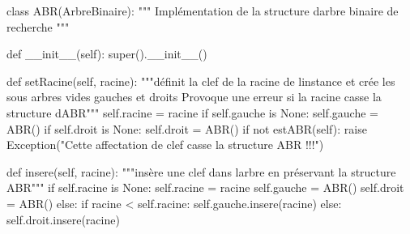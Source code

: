\documentclass[
  letterpaper,
  DIV=11,
  numbers=noendperiod]{scrartcl}
\newenvironment{Shaded}{\begin{snugshade}}{\end{snugshade}}
\newcommand{\BuiltInTok}[1]{\textcolor[rgb]{0.00,0.23,0.31}{#1}}
\newcommand{\CommentTok}[1]{\textcolor[rgb]{0.37,0.37,0.37}{#1}}
\newcommand{\ControlFlowTok}[1]{\textcolor[rgb]{0.00,0.23,0.31}{#1}}
\newcommand{\FunctionTok}[1]{\textcolor[rgb]{0.28,0.35,0.67}{#1}}
\newcommand{\KeywordTok}[1]{\textcolor[rgb]{0.00,0.23,0.31}{#1}}
\newcommand{\NormalTok}[1]{\textcolor[rgb]{0.00,0.23,0.31}{#1}}
\newcommand{\OperatorTok}[1]{\textcolor[rgb]{0.37,0.37,0.37}{#1}}
\newcommand{\PreprocessorTok}[1]{\textcolor[rgb]{0.68,0.00,0.00}{#1}}
\newcommand{\StringTok}[1]{\textcolor[rgb]{0.13,0.47,0.30}{#1}}
\newcommand{\VariableTok}[1]{\textcolor[rgb]{0.07,0.07,0.07}{#1}}
\begin{document}
\begin{Shaded}
\begin{Highlighting}[]
\KeywordTok{class}\NormalTok{ ABR(ArbreBinaire):}
    \CommentTok{""" Implémentation de la structure d\textquotesingle{}arbre binaire de recherche """}

    \KeywordTok{def} \FunctionTok{\_\_init\_\_}\NormalTok{(}\VariableTok{self}\NormalTok{):}
        \BuiltInTok{super}\NormalTok{().}\FunctionTok{\_\_init\_\_}\NormalTok{()}

    \KeywordTok{def}\NormalTok{ setRacine(}\VariableTok{self}\NormalTok{, racine):}
        \CommentTok{"""définit la clef de la racine de l\textquotesingle{}instance}
\CommentTok{         et crée les sous arbres vides gauches et droits}
\CommentTok{         Provoque une erreur si la racine casse la structure d\textquotesingle{}ABR"""}
        \VariableTok{self}\NormalTok{.racine }\OperatorTok{=}\NormalTok{ racine}
        \ControlFlowTok{if} \VariableTok{self}\NormalTok{.gauche }\KeywordTok{is} \VariableTok{None}\NormalTok{:}
            \VariableTok{self}\NormalTok{.gauche }\OperatorTok{=}\NormalTok{ ABR()}
        \ControlFlowTok{if} \VariableTok{self}\NormalTok{.droit }\KeywordTok{is} \VariableTok{None}\NormalTok{:}
            \VariableTok{self}\NormalTok{.droit }\OperatorTok{=}\NormalTok{ ABR()}
        \ControlFlowTok{if} \KeywordTok{not}\NormalTok{ estABR(}\VariableTok{self}\NormalTok{):}
            \ControlFlowTok{raise} \PreprocessorTok{Exception}\NormalTok{(}\StringTok{"Cette affectation de clef casse la structure ABR !!!"}\NormalTok{)}

    \KeywordTok{def}\NormalTok{ insere(}\VariableTok{self}\NormalTok{, racine):}
        \CommentTok{"""insère une clef dans l\textquotesingle{}arbre en préservant la structure ABR"""}
        \ControlFlowTok{if} \VariableTok{self}\NormalTok{.racine }\KeywordTok{is} \VariableTok{None}\NormalTok{:}
            \VariableTok{self}\NormalTok{.racine }\OperatorTok{=}\NormalTok{ racine}
            \VariableTok{self}\NormalTok{.gauche }\OperatorTok{=}\NormalTok{ ABR()}
            \VariableTok{self}\NormalTok{.droit }\OperatorTok{=}\NormalTok{ ABR()}
        \ControlFlowTok{else}\NormalTok{:}
            \ControlFlowTok{if}\NormalTok{ racine }\OperatorTok{\textless{}} \VariableTok{self}\NormalTok{.racine:}
                \VariableTok{self}\NormalTok{.gauche.insere(racine)}
            \ControlFlowTok{else}\NormalTok{:}
                \VariableTok{self}\NormalTok{.droit.insere(racine)}
\end{Highlighting}
\end{Shaded}
\end{document}

